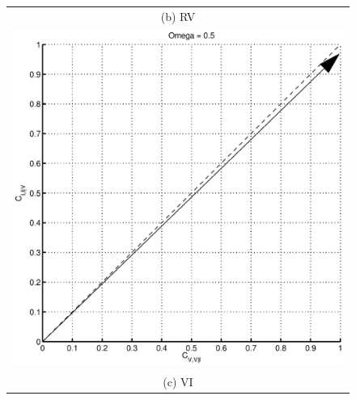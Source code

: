 \documentclass[a4paper,11pt]{article}
\begin{document}
\begin{figure}[ht]
\begin{tabular}{c}
(b) RV \\[6pt]
\includegraphics[scale=0.45]{Figure4C.eps}\\
(c) VI\\[6pt]
\end{tabular}
\end{figure}
\end{document}
